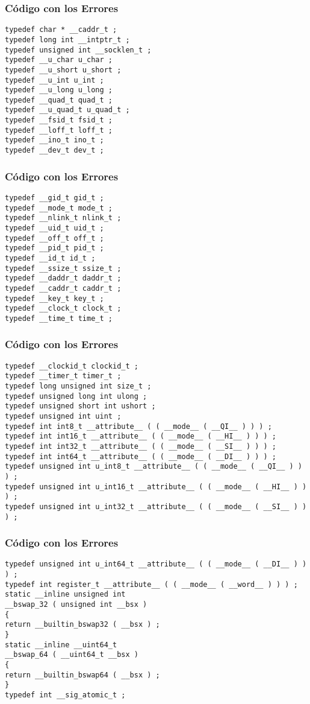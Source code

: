 \documentclass{beamer}
\begin{document}
\begin{frame}[fragile]
\frametitle{C\'odigo con los Errores}
\begin{verbatim}
typedef char * __caddr_t ; 
typedef long int __intptr_t ; 
typedef unsigned int __socklen_t ; 
typedef __u_char u_char ; 
typedef __u_short u_short ; 
typedef __u_int u_int ; 
typedef __u_long u_long ; 
typedef __quad_t quad_t ; 
typedef __u_quad_t u_quad_t ; 
typedef __fsid_t fsid_t ; 
typedef __loff_t loff_t ; 
typedef __ino_t ino_t ; 
typedef __dev_t dev_t ; 
\end{verbatim}
\end{frame}
\begin{frame}[fragile]
\frametitle{C\'odigo con los Errores}
\begin{verbatim}
typedef __gid_t gid_t ; 
typedef __mode_t mode_t ; 
typedef __nlink_t nlink_t ; 
typedef __uid_t uid_t ; 
typedef __off_t off_t ; 
typedef __pid_t pid_t ; 
typedef __id_t id_t ; 
typedef __ssize_t ssize_t ; 
typedef __daddr_t daddr_t ; 
typedef __caddr_t caddr_t ; 
typedef __key_t key_t ; 
typedef __clock_t clock_t ; 
typedef __time_t time_t ; 
\end{verbatim}
\end{frame}
\begin{frame}[fragile]
\frametitle{C\'odigo con los Errores}
\begin{verbatim}
typedef __clockid_t clockid_t ; 
typedef __timer_t timer_t ; 
typedef long unsigned int size_t ; 
typedef unsigned long int ulong ; 
typedef unsigned short int ushort ; 
typedef unsigned int uint ; 
typedef int int8_t __attribute__ ( ( __mode__ ( __QI__ ) ) ) ; 
typedef int int16_t __attribute__ ( ( __mode__ ( __HI__ ) ) ) ; 
typedef int int32_t __attribute__ ( ( __mode__ ( __SI__ ) ) ) ; 
typedef int int64_t __attribute__ ( ( __mode__ ( __DI__ ) ) ) ; 
typedef unsigned int u_int8_t __attribute__ ( ( __mode__ ( __QI__ ) ) ) ; 
typedef unsigned int u_int16_t __attribute__ ( ( __mode__ ( __HI__ ) ) ) ; 
typedef unsigned int u_int32_t __attribute__ ( ( __mode__ ( __SI__ ) ) ) ; 
\end{verbatim}
\end{frame}
\begin{frame}[fragile]
\frametitle{C\'odigo con los Errores}
\begin{verbatim}
typedef unsigned int u_int64_t __attribute__ ( ( __mode__ ( __DI__ ) ) ) ; 
typedef int register_t __attribute__ ( ( __mode__ ( __word__ ) ) ) ; 
static __inline unsigned int 
__bswap_32 ( unsigned int __bsx ) 
{ 
return __builtin_bswap32 ( __bsx ) ; 
} 
static __inline __uint64_t 
__bswap_64 ( __uint64_t __bsx ) 
{ 
return __builtin_bswap64 ( __bsx ) ; 
} 
typedef int __sig_atomic_t ; 
\end{verbatim}
\end{frame}
\end{document}
